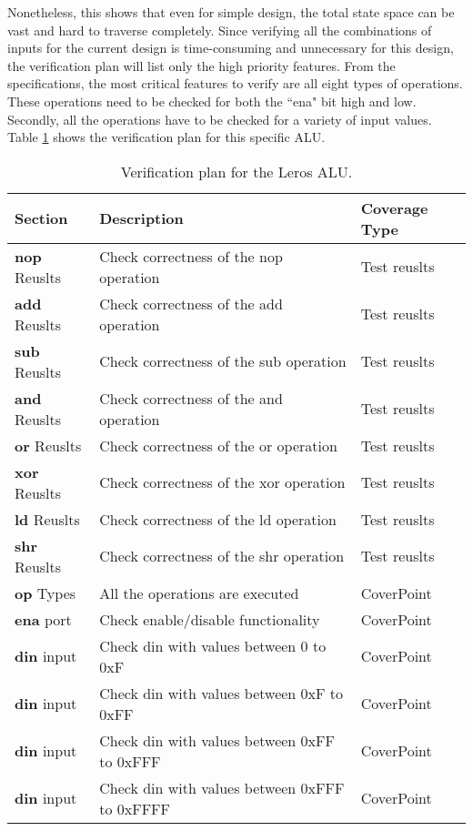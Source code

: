 Nonetheless, this shows that even for simple design, the total state space can
be vast and hard to traverse completely. Since verifying all the combinations of
inputs for the current design is time-consuming and unnecessary for this design,
the verification plan will list only the high priority features. From the
specifications, the most critical features to verify are all eight types of
operations. These operations need to be checked for both the ``ena" bit high and
low. Secondly, all the operations have to be checked for a variety of input
values. Table \ref{table:verificationplan} shows the verification plan for this
specific ALU.


\begin{table}[!h]
\centering
\begin{tabular}{l|l|l}
\textbf{Section} & \textbf{Description} & \textbf{Coverage Type}\\
\hline
\textbf{nop} Reuslts & Check correctness of the nop operation & Test reuslts\\
\textbf{add} Reuslts & Check correctness of the add operation & Test reuslts\\
\textbf{sub} Reuslts & Check correctness of the sub operation & Test reuslts\\
\textbf{and} Reuslts & Check correctness of the and operation & Test reuslts\\
\textbf{or} Reuslts & Check correctness of the or operation & Test reuslts\\
\textbf{xor} Reuslts & Check correctness of the xor operation & Test reuslts\\
\textbf{ld} Reuslts & Check correctness of the ld operation & Test reuslts\\
\textbf{shr} Reuslts & Check correctness of the shr operation & Test reuslts\\
\textbf{op} Types & All the operations are executed & CoverPoint\\
\textbf{ena} port & Check enable/disable functionality & CoverPoint\\
\textbf{din} input & Check din with values between 0 to 0xF & CoverPoint\\
\textbf{din} input & Check din with values between 0xF to 0xFF & CoverPoint\\
\textbf{din} input & Check din with values between 0xFF to 0xFFF & CoverPoint\\
\textbf{din} input & Check din with values between 0xFFF to 0xFFFF & CoverPoint\\
\end{tabular}
\caption{Verification plan for the Leros ALU.}
\label{table:verificationplan}
\end{table}


